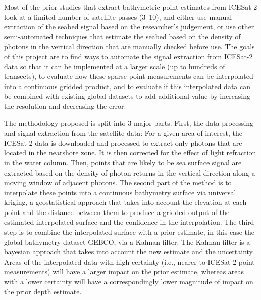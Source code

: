 Most of the prior studies that extract bathymetric point estimates from ICESat-2 look at a limited number of satellite passes (3--10), and either use manual extraction of the seabed signal based on the researcher's judgement, or use other semi-automated techniques that estimate the seabed based on the density of photons in the vertical direction that are manually checked before use. The goals of this project are to find ways to automate the signal extraction from ICESat-2 data so that it can be implemented at a larger scale (up to hundreds of transects), to evaluate how these sparse point measurements can be interpolated into a continuous gridded product, and to evaluate if this interpolated data can be combined with existing global datasets to add additional value by increasing the resolution and decreasing the error. 
\vskip 0.1in

The methodology proposed is split into 3 major parts. First, the data processing and signal extraction from the satellite data: For a given area of interest, the ICESat-2 data is downloaded and processed to extract only photons that are located in the nearshore zone. It is then corrected for the effect of light refraction in the water column. Then, points that are likely to be sea surface signal are extracted based on the density of photon returns in the vertical direction along a moving window of adjacent photons. The second part of the method is to interpolate these points into a continuous bathymetry surface via universal kriging, a geostatistical approach that takes into account the elevation at each point and the distance between them to produce a gridded output of the estimated interpolated surface and the confidence in the interpolation. The third step is to combine the interpolated surface with a prior estimate, in this case the global bathymetry dataset GEBCO, via a Kalman filter. The Kalman filter is a bayesian approach that takes into account the new estimate and the uncertainty. Areas of the interpolated data with high certainty (i.e., nearer to ICESat-2 point measurements) will have a larger impact on the prior estimate, whereas areas with a lower certainty will have a correspondingly lower magnitude of impact on the prior depth estimate.
\vskip 0.1in

